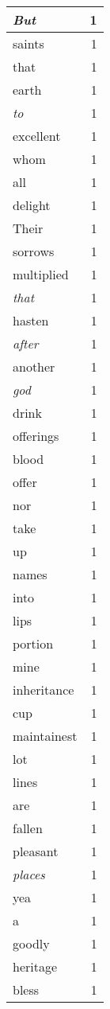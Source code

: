 \begin{center}
\begin{longtable}{l|r}
\emph{But} & 1 \\ \hline
saints & 1 \\ \hline
that & 1 \\ \hline
earth & 1 \\ \hline
\emph{to} & 1 \\ \hline
excellent & 1 \\ \hline
whom & 1 \\ \hline
all & 1 \\ \hline
delight & 1 \\ \hline
Their & 1 \\ \hline
sorrows & 1 \\ \hline
multiplied & 1 \\ \hline
\emph{that} & 1 \\ \hline
hasten & 1 \\ \hline
\emph{after} & 1 \\ \hline
another & 1 \\ \hline
\emph{god} & 1 \\ \hline
drink & 1 \\ \hline
offerings & 1 \\ \hline
blood & 1 \\ \hline
offer & 1 \\ \hline
nor & 1 \\ \hline
take & 1 \\ \hline
up & 1 \\ \hline
names & 1 \\ \hline
into & 1 \\ \hline
lips & 1 \\ \hline
portion & 1 \\ \hline
mine & 1 \\ \hline
inheritance & 1 \\ \hline
cup & 1 \\ \hline
maintainest & 1 \\ \hline
lot & 1 \\ \hline
lines & 1 \\ \hline
are & 1 \\ \hline
fallen & 1 \\ \hline
pleasant & 1 \\ \hline
\emph{places} & 1 \\ \hline
yea & 1 \\ \hline
a & 1 \\ \hline
goodly & 1 \\ \hline
heritage & 1 \\ \hline
bless & 1 \\ \hline

\end{longtable}
\end{center}
